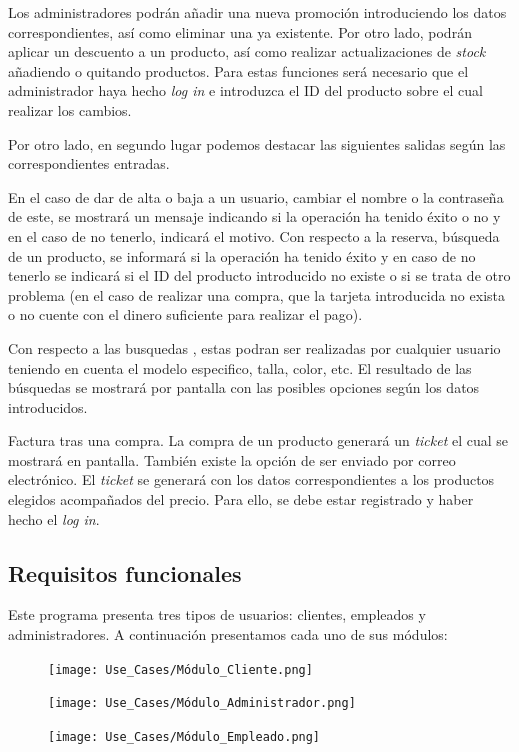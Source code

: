 Los administradores podrán añadir una nueva promoción introduciendo los datos correspondientes, así como eliminar una ya existente. Por otro lado, podrán aplicar un descuento a un producto, así como realizar actualizaciones de \textit{stock} añadiendo o quitando productos. Para estas funciones será necesario que el administrador haya hecho \textit{log in} e introduzca el ID del producto sobre el cual realizar los cambios.

Por otro lado, en segundo lugar podemos destacar las siguientes salidas según las correspondientes entradas.

En el caso de dar de alta o baja a un usuario, cambiar el nombre o la contraseña de este, se mostrará un mensaje indicando si la operación ha tenido éxito o no y en el caso de no tenerlo, indicará el motivo.
Con respecto a la reserva, búsqueda de un producto, se informará si la operación ha tenido éxito y en caso de no tenerlo se indicará si el ID del producto introducido no existe o si se trata de otro problema (en el caso de realizar una compra, que la tarjeta introducida no exista o no cuente con el dinero suficiente para realizar el pago).

Con respecto a las busquedas , estas podran ser realizadas por cualquier usuario teniendo en cuenta el modelo especifico, talla, color, etc. El resultado de las búsquedas se mostrará por pantalla con las posibles opciones según los datos introducidos.

Factura tras una compra. La compra de un producto generará un \textit{ticket} el cual se mostrará en pantalla. También existe la opción de ser enviado por correo electrónico. El \textit{ticket} se generará con los datos correspondientes a los productos elegidos acompañados del precio. Para ello, se debe estar registrado y haber hecho el \textit{log in}.



\subsection{Requisitos funcionales}
Este programa presenta tres tipos de usuarios: clientes, empleados y administradores. A continuación presentamos cada uno de sus módulos:
\begin{figure}[H]
	\centering
	\texttt{[image: Use\_Cases/Módulo\_Cliente.png]}
\end{figure}

\begin{figure}[H]
	\centering
	\texttt{[image: Use\_Cases/Módulo\_Administrador.png]}
\end{figure}
\begin{figure}[H]
	\centering
	\texttt{[image: Use\_Cases/Módulo\_Empleado.png]}
\end{figure}


